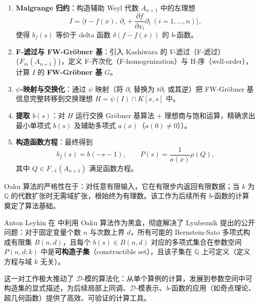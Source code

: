 \documentclass[12pt,a4paper]{ctexrep}   %
\begin{document}
\begin{enumerate}
    \item \textbf{Malgrange 归约}：构造辅助 Weyl 代数 \(A_{n+1}\) 中的左理想
          \[
              I = \bigl\langle t-f(x),\ \partial_i + \frac{\partial f}{\partial x_i}\partial_t \ (i=1,\dots,n)\bigr\rangle,
          \]
          使得 \(b_f(s)\) 等价于 delta 函数 \(\delta(f-f(x))\) 的 \(b\)-函数。

    \item \textbf{F-滤过与 FW-Gröbner 基}：引入 Kashiwara 的 \(V\)-滤过（F-滤过）\(\{F_m(A_{n+1})\}\)，定义 F-齐次化（F-homogenization）与 H-序（well-order），计算 \(I\) 的 \textbf{FW-Gröbner 基} \(G\)。

    \item \textbf{\(\psi\)-映射与交换化}：通过 \(\psi\) 映射（将 \(\partial_t\) 替换为 \(t\partial_t\) 或其逆）把 FW-Gröbner 基信息完整转移到交换理想 \(H = \psi(I) \cap K[x,s]\) 中。

    \item \textbf{提取 \(b(s)\)}：对 \(H\) 运行交换 Gröbner 基算法 + 理想商与饱和运算，精确求出最小单项式 \(b(s)\) 及辅助多项式 \(a(x)\)（\(a(0)\ne0\)））。

    \item \textbf{构造函数方程}：最终得到
          \[
              b_f(s) = b(-s-1),\qquad P(s) = \frac{1}{a(x)}\rho(Q),
          \]
          其中 \(Q\in F_{-1}(A_{n+1})\) 满足函数方程。
\end{enumerate}

Oaku 算法的严格性在于：对任意有限输入，它在有限步内返回有限数据；当 \(k\) 为 \(\mathbb{Q}\) 的代数扩张时无需域扩张，根始终为有理数。该工作为后续所有 \(b\)-函数的计算奠定了算法基础。


Anton Leykin 在 \cite{leykin2000definitive} 中利用 Oaku 算法作为黑盒，彻底解决了 Lyubeznik 提出的公开问题：对于固定变量个数 \(n\) 与次数上界 \(d\)，所有可能的 Bernstein-Sato 多项式构成有限集 \(B(n,d)\)，且每个 \(b(s)\in B(n,d)\) 对应的多项式集合在参数空间 \(P(n,d;k)\) 中是\textbf{可构造子集}（constructible set），且该子集在 \(\mathbb{Q}\) 上可定义（定义方程与域 \(k\) 无关）。


这一对工作极大推动了 \(\mathcal{D}\)-模的算法化：从单个算例的计算，发展到参数空间中可构造集的显式描述，为后续局部上同调、\(\mathcal{D}\)-模表示、\(b\)-函数的应用（如奇点理论、超几何函数）提供了高效、可验证的计算工具。
\end{document}
